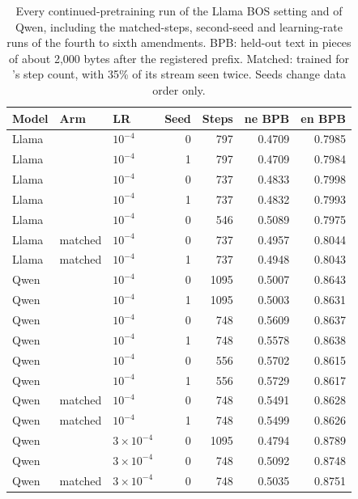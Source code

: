 \begin{table}[!htb]
\centering\small
\setlength{\tabcolsep}{4pt}
\begin{tabular}{lllrrrr}
\toprule
Model & Arm & LR & Seed & Steps & ne BPB & en BPB \\
\midrule
Llama & \RO{} & $10^{-4}$ & 0 & 797 & 0.4709 & 0.7985 \\
Llama & \RO{} & $10^{-4}$ & 1 & 797 & 0.4709 & 0.7984 \\
Llama & \RI{} & $10^{-4}$ & 0 & 737 & 0.4833 & 0.7998 \\
Llama & \RI{} & $10^{-4}$ & 1 & 737 & 0.4832 & 0.7993 \\
Llama & \RII{} & $10^{-4}$ & 0 & 546 & 0.5089 & 0.7975 \\
Llama & \RII{} matched & $10^{-4}$ & 0 & 737 & 0.4957 & 0.8044 \\
Llama & \RII{} matched & $10^{-4}$ & 1 & 737 & 0.4948 & 0.8043 \\
\midrule
Qwen & \RO{} & $10^{-4}$ & 0 & 1095 & 0.5007 & 0.8643 \\
Qwen & \RO{} & $10^{-4}$ & 1 & 1095 & 0.5003 & 0.8631 \\
Qwen & \RI{} & $10^{-4}$ & 0 & 748 & 0.5609 & 0.8637 \\
Qwen & \RI{} & $10^{-4}$ & 1 & 748 & 0.5578 & 0.8638 \\
Qwen & \RII{} & $10^{-4}$ & 0 & 556 & 0.5702 & 0.8615 \\
Qwen & \RII{} & $10^{-4}$ & 1 & 556 & 0.5729 & 0.8617 \\
Qwen & \RII{} matched & $10^{-4}$ & 0 & 748 & 0.5491 & 0.8628 \\
Qwen & \RII{} matched & $10^{-4}$ & 1 & 748 & 0.5499 & 0.8626 \\
Qwen & \RO{} & $3{\times}10^{-4}$ & 0 & 1095 & 0.4794 & 0.8789 \\
Qwen & \RI{} & $3{\times}10^{-4}$ & 0 & 748 & 0.5092 & 0.8748 \\
Qwen & \RII{} matched & $3{\times}10^{-4}$ & 0 & 748 & 0.5035 & 0.8751 \\
\bottomrule
\end{tabular}
\caption{Every continued-pretraining run of the Llama BOS setting and of Qwen, including the matched-steps, second-seed and learning-rate runs of the fourth to sixth amendments. BPB: held-out text in pieces of about 2{,}000 bytes after the registered prefix. Matched: \RII{} trained for \RI{}'s step count, with 35\% of its stream seen twice. Seeds change data order only.}
\label{tab:extra-runs}
\end{table}

